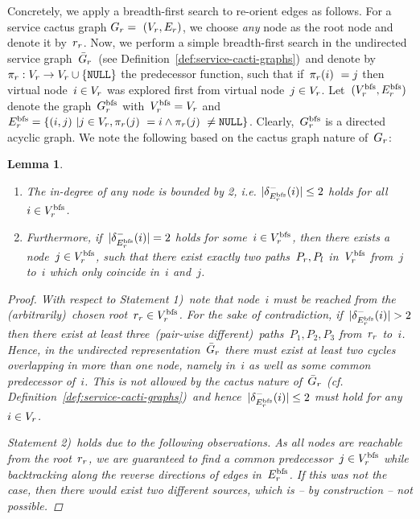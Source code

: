 \documentclass[10pt, conference, letterpaper]{IEEEtran}
\newtheorem{lemma}[theorem]{Lemma}
\begin{document}
Concretely, we apply a breadth-first search to re-orient edges as follows. For a service cactus graph $G_{r} =~(V_{r},E_{r})$, we choose \emph{any} node as the root node and denote it by~$\VVroot$. Now, we perform a simple breadth-first search in the undirected service graph~$\bar{G}_{r}$~(see Definition~\ref{def:service-cacti-graphs})~and denote by~$\VVpred : \VV \to \VV \cup \{\NULL\}$ the predecessor function, such that if~$\VVpred(i)~= j$  then virtual node~$i\in V_{r}$ was explored first from virtual node~$j \in V_{r}$. Let~$(V^{\textnormal{bfs}}_{r}, E^{\textnormal{bfs}}_{r})$ denote the graph~$G^{\textnormal{bfs}}_{r}$ with~$V^{\textnormal{bfs}}_{r} = V_{r}$ and~$\VEbfs = \{(i,j)~| j \in \VV,  \VVpred(j)~= i \wedge \VVpred(j)~\neq \NULL \}$. Clearly,~$G^{\textnormal{bfs}}_{r}$ is a directed acyclic graph. We note the following based on the cactus graph nature of~$G_{r}$:
\begin{lemma}~\\
\vspace{-12pt}
\label{lem:observations-bfs-graphs}
\begin{enumerate}
\item The in-degree of any node is bounded by 2, i.e. $|\delta_{E^{\textnormal{bfs}}_{r}}^-(i)| \leq 2$ holds for all $i \in V^{\textnormal{bfs}}_{r}$.
\item Furthermore, if~$|\delta_{E^{\textnormal{bfs}}_{r}}^-(i)| = 2$ holds for some~$i \in V^{\textnormal{bfs}}_{r}$, then there exists a node~$j \in V^{\textnormal{bfs}}_{r}$, such that there exist exactly two paths~$P_r,P_l$ in~$V^{\textnormal{bfs}}_{r}$ from~$j$ to~$i$ which only coincide in~$i$ and~$j$.
\end{enumerate}
\begin{proof}
With respect to Statement 1)~note that node~$i$ must be reached from the (arbitrarily)~chosen root~$\VVroot \in \VVbfs$. For the sake of contradiction, if~$|\delta_{E^{\textnormal{bfs}}_{r}}^-(i)| > 2$ then there exist at least three~(pair-wise different)~paths~$P_1,P_2,P_3$ from~$\VVroot$ to~$i$. Hence, in the undirected representation~$\bar{G}_{r}$ there must exist at least two cycles overlapping in more than one node, namely in~$i$ as well as some common predecessor of~$i$. This is not allowed by the cactus nature of~$\bar{G}_{r}$ (cf. Definition~\ref{def:service-cacti-graphs})~and hence~$|\delta_{E^{\textnormal{bfs}}_{r}}^-(i)| \leq 2$ must hold for any~$i \in V_{r}$.

Statement 2)~holds due to the following observations. As all nodes are reachable from the root~$\VVroot$, we are guaranteed to find a common predecessor~$j \in V^{\textnormal{bfs}}_{r}$ while backtracking along the reverse directions of edges in~$E^{\textnormal{bfs}}_{r}$. If this was not the case, then there would exist two different sources, which is -- by construction -- not possible.
\end{proof}
\end{lemma}
\end{document}
